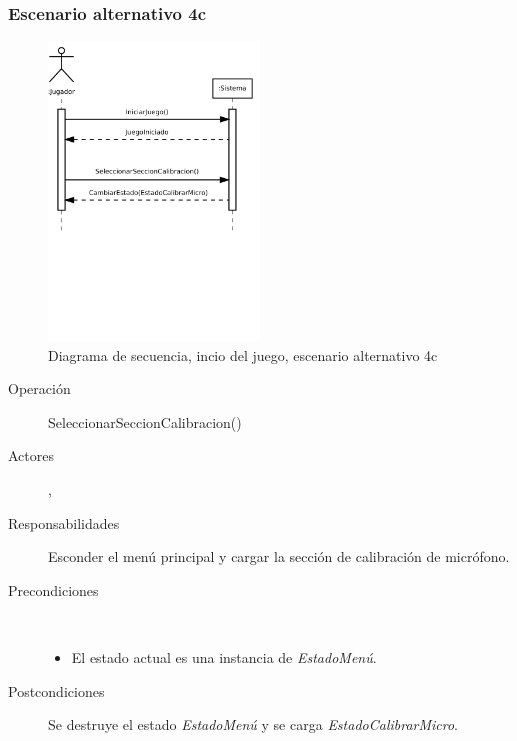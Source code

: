 \subsubsection{Escenario alternativo 4c}
\begin{figure}[h!]
  \centering
  \includegraphics[trim=0cm 10cm 0cm 0cm, clip=true, width=0.5\textwidth]{4_analisis/diagsec_caso1_esc4}
  \caption{Diagrama de secuencia, incio del juego, escenario alternativo 4c}
\end{figure}

\begin{description}
\item[Operación] SeleccionarSeccionCalibracion()
\item[Actores] \jugador, \sistema
\item[Responsabilidades] Esconder el menú principal y cargar la sección de
  calibración de micrófono.
\item[Precondiciones] $\quad$
  \begin{itemize}
  \item El estado actual es una instancia de \textit{EstadoMenú}.
  \end{itemize}
\item[Postcondiciones] Se destruye el estado \textit{EstadoMenú} y se carga
  \textit{EstadoCalibrarMicro}.
\end{description}

